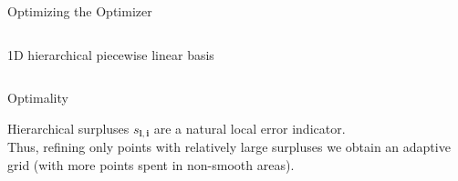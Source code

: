 \documentclass[final]{beamer}
\newcommand {\bxi} {\mbox{\boldmath $\xi$}}%
\newcommand{\bl}{\ensuremath{\mathbf{l}}} %
\newcommand{\bi}{\ensuremath{\mathbf{i}}} %
\begin{document}
\begin{frame}{}
{\begin{columns}[t]
\begin{column}{.30\linewidth}
\begin{block}{\centering Optimizing the Optimizer}
\begin{columns}[T]
\begin{column}{12cm}{}
\vspace{1em}
\centering \scriptsize{1D hierarchical piecewise linear basis}
\end{column}
\end{columns}


\end{block}
                
 \begin{block}{\centering Optimality}

Hierarchical surpluses $s_{\bl,\bi}$ are a natural local error indicator.\\

Thus, refining only points with relatively large surpluses we obtain an adaptive grid (with more points spent in non-smooth areas).\\
%


\end{block}
\end{column}
\end{columns}}
\end{frame}
\end{document}
